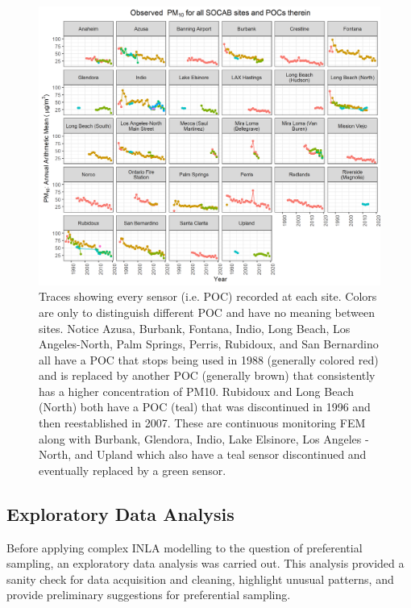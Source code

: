 \documentclass{article}
\begin{document}
\begin{figure}[ht]
    \centering
    \includegraphics[width = \textwidth]{Figures/POC_all_trace.png}
    \caption{Traces showing every sensor (i.e. \ac{POC}) recorded at each site.  Colors are only to distinguish different \ac{POC} and have no meaning between sites.  Notice Azusa, Burbank, Fontana, Indio, Long Beach, Los Angeles-North, Palm Springs, Perris, Rubidoux, and San Bernardino all have a \ac{POC} that stops being used in 1988 (generally colored red) and is replaced by another \ac{POC} (generally brown) that consistently has a higher concentration of \ac{PM10}.  Rubidoux and Long Beach (North) both have a \ac{POC} (teal) that was discontinued in 1996 and then reestablished in 2007. These are continuous monitoring \ac{FEM} along with Burbank, Glendora, Indio, Lake Elsinore, Los Angeles - North, and Upland which also have a teal sensor discontinued and eventually replaced by a green sensor.}
    \label{fig:POC_all_trace}
\end{figure}

\subsection{Exploratory Data Analysis}
\label{subsec:eda}
Before applying complex INLA modelling to the question of preferential sampling, an exploratory data analysis was carried out.  This analysis provided a sanity check for data acquisition and cleaning, highlight unusual patterns, and provide preliminary suggestions for preferential sampling.
\end{document}
